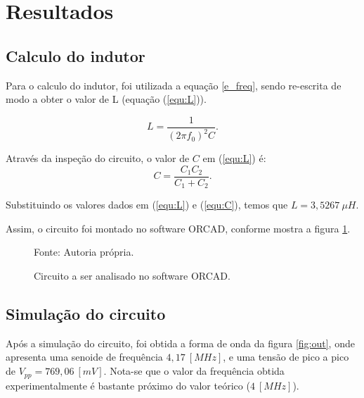 \newpage
\section{Resultados}

\subsection{Calculo do indutor}

Para o calculo do indutor, foi utilizada a equação \ref{e_freq}, sendo re-escrita de modo a obter o valor de L (equação (\ref{equ:L})).

\begin{equation}
    \label{equ:L}
    L = \frac{1}{(2\pi f_0)^2 C}.
\end{equation}

Através da inspeção do circuito, o valor de $C$ em (\ref{equ:L}) é:
\begin{equation}
    \label{equ:C}
    C = \frac{C_1 C_2}{C_1 + C_2}.
\end{equation}

Substituindo os valores dados em (\ref{equ:L}) e (\ref{equ:C}), temos que $L = 3,5267 \ \mu H$.

Assim, o circuito foi montado no software ORCAD, conforme mostra a figura \ref{fig:cir}.

\begin{figure}[H]
    \centering
    \caption{Circuito a ser analisado no software ORCAD.}\label{fig:cir}

    \small Fonte: Autoria própria.
\end{figure}

\subsection{Simulação do circuito}

Após a simulação do circuito, foi obtida a forma de onda da figura \ref{fig:out}, onde apresenta uma senoide de frequência $4,17 \ [MHz]$, e uma tensão de pico a pico de $V_{pp} = 769,06 \ [mV]$. Nota-se que o valor da frequência obtida experimentalmente é bastante próximo do valor teórico ($4 \ [MHz]$).

